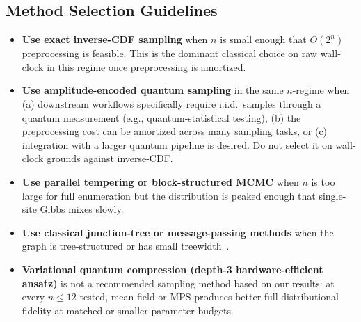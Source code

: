 \documentclass[conference,10pt]{IEEEtran}
\begin{document}
\subsection{Method Selection Guidelines}
\begin{itemize}[leftmargin=*, topsep=0pt, partopsep=0pt, itemsep=2pt, parsep=0pt]
    \item \textbf{Use exact inverse-CDF sampling} when $n$ is small enough that $O(2^n)$ preprocessing is feasible. This is the dominant classical choice on raw wall-clock in this regime once preprocessing is amortized.
    \item \textbf{Use amplitude-encoded quantum sampling} in the same $n$-regime when (a) downstream workflows specifically require i.i.d.\ samples through a quantum measurement (e.g., quantum-statistical testing), (b) the preprocessing cost can be amortized across many sampling tasks, or (c) integration with a larger quantum pipeline is desired. Do not select it on wall-clock grounds against inverse-CDF.
    \item \textbf{Use parallel tempering or block-structured MCMC} when $n$ is too large for full enumeration but the distribution is peaked enough that single-site Gibbs mixes slowly.
    \item \textbf{Use classical junction-tree or message-passing methods} when the graph is tree-structured or has small treewidth~\cite{lauritzen1988local}.
    \item \textbf{Variational quantum compression (depth-3 hardware-efficient ansatz)} is not a recommended sampling method based on our results: at every $n \le 12$ tested, mean-field or MPS produces better full-distributional fidelity at matched or smaller parameter budgets.
\end{itemize}
\end{document}
